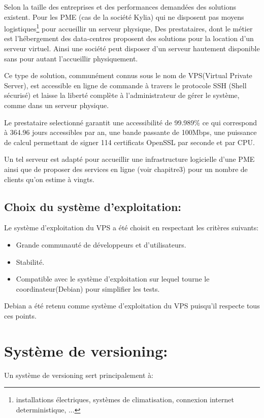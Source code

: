 \documentclass{themeensg}
\begin{document}
Selon la taille des entreprises et des performances demandées des solutions existent. Pour les PME (cas de la société Kylia) qui ne disposent pas moyens logistiques\footnote{installations électriques, systèmes de climatisation, connexion internet deterministique, ...} pour accueillir un serveur physique, Des prestataires, dont le métier est l'hébergement des data-centres proposent des solutions pour la location d'un serveur virtuel. Ainsi une société peut disposer d'un serveur hautement disponible sans pour autant l'accueillir physiquement.

Ce type de solution, communément connus sous le nom de VPS(Virtual Private Server), est accessible en ligne de commande à travers le protocole SSH (Shell sécurisé) et laisse la liberté complète à l'administrateur de gérer le système, comme dans un serveur physique.

Le prestataire selectionné garantit une accessibilité de 99.989\% ce qui correspond à 364.96 jours accessibles par an, une bande passante de 100Mbps, une puissance de calcul permettant de signer 114 certificats OpenSSL par seconde et par CPU.

Un tel serveur est adapté pour accueillir une infrastructure logicielle d'une PME ainsi que de proposer des services en ligne (voir chapitre3) pour un nombre de clients qu'on estime à vingts.

\subsection{Choix du système d'exploitation:}

Le système d'exploitation du VPS a été choisit en respectant les critères suivants:
\begin{itemize}
\item Grande communauté de développeurs et d'utilisateurs.
\item Stabilité.
\item Compatible avec le système d'exploitation sur lequel tourne le coordinateur(Debian) pour simplifier les tests.
\end{itemize}

Debian a été retenu comme système d'exploitation du VPS puisqu'il respecte tous ces points.

\section{Système de versioning:}
Un système de versioning sert principalement à:
\end{document}
